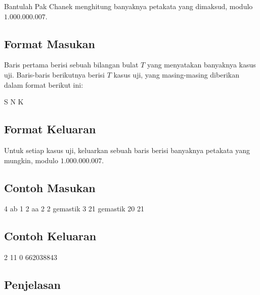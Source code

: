 \documentclass[../main_problemset.tex]{subfiles} %
\begin{document}
Bantulah Pak Chanek menghitung banyaknya petakata yang dimaksud, modulo $ 1.000.000.007 $.

\subsection*{Format Masukan}

Baris pertama berisi sebuah bilangan bulat $ T $ yang menyatakan banyaknya kasus uji. Baris-baris berikutnya berisi $ T $ kasus uji, yang masing-masing diberikan dalam format berikut ini:

\begin{lcverbatim}
S N K
\end{lcverbatim}

\subsection*{Format Keluaran}

Untuk setiap kasus uji, keluarkan sebuah baris berisi banyaknya petakata yang mungkin, modulo $ 1.000.000.007 $.

\vspace{.4cm}

\begin{minipage}[t]{0.5\textwidth}
\subsection*{Contoh Masukan}

\begin{lcverbatim}
4
ab 1 2
aa 2 2
gemastik 3 21
gemastik 20 21
\end{lcverbatim}
\end{minipage}
\begin{minipage}[t]{0.5\textwidth}
\subsection*{Contoh Keluaran}

\begin{lcverbatim}
2
11
0
662038843
\end{lcverbatim}
\end{minipage}

\pagebreak
\subsection*{Penjelasan}
\end{document}
